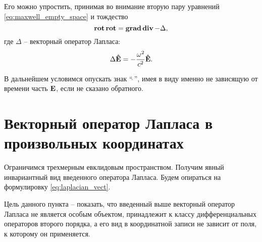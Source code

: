 \documentclass[12pt,a4paper]{article}
\begin{document}
        Его можно упростить, принимая во внимание вторую пару уравнений \autoref{eq:maxwell_empty_space} и тождество
        \begin{equation}\label{eq:laplacian_vect}
            \operatorname{\mathbf{rot}}\operatorname{\mathbf{rot}} = \operatorname{\mathbf{grad}}\operatorname{\mathbf{div}} - \Delta,
        \end{equation}
        где $\Delta$ -- векторный оператор Лапласа:
        \begin{equation}
            \Delta\mathbf{\hat{E}} = - \frac{\omega^2}{c^2} \mathbf{\hat{E}}.
        \end{equation}

        В дальнейшем условимся опускать знак \enquote{$\hat{\ }$}, имея в виду именно не зависящую от времени часть $\mathbf{E}$, если не сказано обратного.


    \section{Векторный оператор Лапласа в произвольных координатах}

        Ограничимся трехмерным евклидовым пространством. Получим явный инвариантный вид введенного оператора Лапласа. Будем опираться на формулировку \autoref{eq:laplacian_vect}.

        Цель данного пункта -- показать, что введенный выше векторный оператор Лапласа не является особым объектом, принадлежит к классу дифференциальных операторов второго порядка, а его вид в координатной записи не зависит от поля, к которому он применяется.
\end{document}
